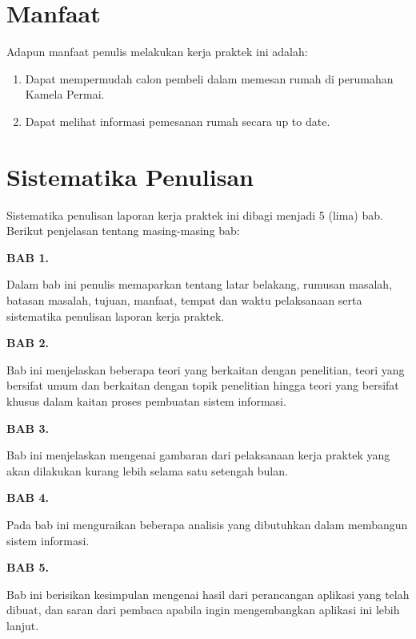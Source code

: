 \section{Manfaat}
Adapun manfaat penulis melakukan kerja praktek ini adalah:

\begin{enumerate}
  \item Dapat mempermudah calon pembeli dalam memesan rumah di perumahan Kamela Permai.
  \item Dapat melihat informasi pemesanan rumah secara up to date.
\end{enumerate}

\section{Sistematika Penulisan}

Sistematika penulisan laporan kerja praktek ini dibagi menjadi 5 (lima) bab. Berikut penjelasan tentang masing-masing bab:

\textbf{BAB 1. \babSatu}

Dalam bab ini penulis memaparkan tentang latar belakang, rumusan masalah, batasan masalah, tujuan, manfaat, tempat dan waktu pelaksanaan serta sistematika penulisan laporan kerja praktek.

\textbf{BAB 2. \babDua}

Bab ini menjelaskan beberapa teori yang berkaitan dengan penelitian, teori yang bersifat umum dan berkaitan dengan topik penelitian hingga teori yang bersifat khusus dalam kaitan proses pembuatan sistem informasi.

\textbf{BAB 3. \babTiga}

Bab ini menjelaskan mengenai gambaran dari pelaksanaan kerja praktek yang akan dilakukan kurang lebih selama satu setengah bulan.


\textbf{BAB 4. \babEmpat}

Pada bab ini menguraikan beberapa analisis yang dibutuhkan dalam membangun sistem informasi.

\textbf{BAB 5. \babLima}

Bab ini berisikan kesimpulan mengenai hasil dari perancangan aplikasi yang telah dibuat, dan saran dari pembaca apabila ingin mengembangkan aplikasi ini lebih lanjut.


